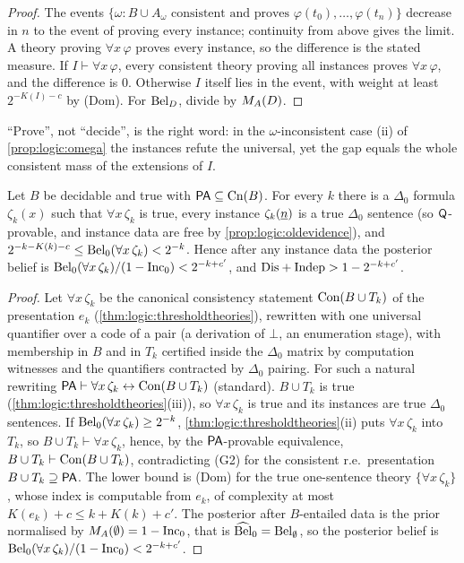 \begin{proof}
The events $\{\omega:B\cup A_\omega\text{ consistent and proves }\varphi(t_0),\dots,\varphi(t_n)\}$ decrease in $n$ to the event of proving every instance; continuity from above gives the limit. A theory proving $\forall x\,\varphi$ proves every instance, so the difference is the stated measure. If $I\vdash\forall x\,\varphi$, every consistent theory proving all instances proves $\forall x\,\varphi$, and the difference is $0$. Otherwise $I$ itself lies in the event, with weight at least $2^{-K(I)-c}$ by (Dom). For $\mathrm{Bel}_D$, divide by $M_{A}(D)$.
\end{proof}

``Prove'', not ``decide'', is the right word: in the $\omega$-inconsistent case (ii) of \cref{prop:logic:omega} the instances refute the universal, yet the gap equals the whole consistent mass of the extensions of $I$.

\begin{theorem}\label{thm:logic:goedelomega}
Let $B$ be decidable and true with $\mathsf{PA}\subseteq\mathrm{Cn}(B)$. For every $k$ there is a $\Delta_0$ formula $\zeta_k(x)$ such that $\forall x\,\zeta_k$ is true, every instance $\zeta_k(\underline{n})$ is a true $\Delta_0$ sentence (so $\mathsf{Q}$-provable, and instance data are free by \cref{prop:logic:oldevidence}), and $2^{-k-K(k)-c}\le\mathrm{Bel}_0(\forall x\,\zeta_k)<2^{-k}$. Hence after any instance data the posterior belief is $\mathrm{Bel}_0(\forall x\,\zeta_k)/(1-\mathrm{Inc}_0)<2^{-k+c'}$, and $\mathrm{Dis}+\mathrm{Indep}>1-2^{-k+c'}$.
\end{theorem}

\begin{proof}
Let $\forall x\,\zeta_k$ be the canonical consistency statement $\mathrm{Con}(B\cup T_k)$ of the presentation $e_k$ (\cref{thm:logic:thresholdtheories}), rewritten with one universal quantifier over a code of a pair (a derivation of $\bot$, an enumeration stage), with membership in $B$ and in $T_k$ certified inside the $\Delta_0$ matrix by computation witnesses and the quantifiers contracted by $\Delta_0$ pairing. For such a natural rewriting $\mathsf{PA}\vdash\forall x\,\zeta_k\leftrightarrow\mathrm{Con}(B\cup T_k)$ (standard). $B\cup T_k$ is true (\cref{thm:logic:thresholdtheories}(iii)), so $\forall x\,\zeta_k$ is true and its instances are true $\Delta_0$ sentences. If $\mathrm{Bel}_0(\forall x\,\zeta_k)\ge2^{-k}$, \cref{thm:logic:thresholdtheories}(ii) puts $\forall x\,\zeta_k$ into $T_k$, so $B\cup T_k\vdash\forall x\,\zeta_k$, hence, by the $\mathsf{PA}$-provable equivalence, $B\cup T_k\vdash\mathrm{Con}(B\cup T_k)$, contradicting (G2) for the consistent r.e.\ presentation $B\cup T_k\supseteq\mathsf{PA}$. The lower bound is (Dom) for the true one-sentence theory $\{\forall x\,\zeta_k\}$, whose index is computable from $e_k$, of complexity at most $K(e_k)+c\le k+K(k)+c'$. The posterior after $B$-entailed data is the prior normalised by $M_{A}(\emptyset)=1-\mathrm{Inc}_0$, that is $\widehat{\mathrm{Bel}}_0=\mathrm{Bel}_\emptyset$, so the posterior belief is $\mathrm{Bel}_0(\forall x\,\zeta_k)/(1-\mathrm{Inc}_0)<2^{-k+c'}$.
\end{proof}

